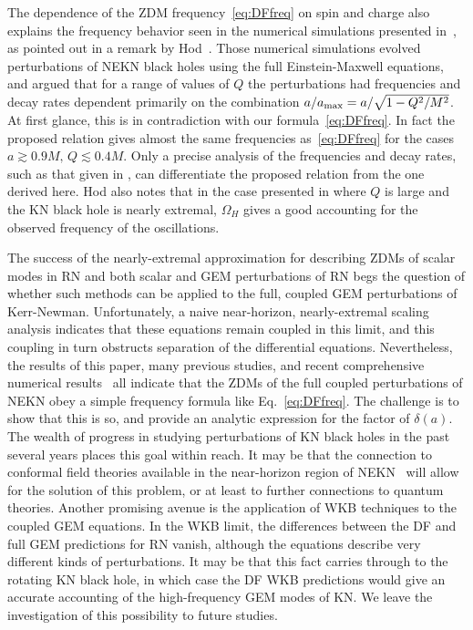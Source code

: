 \begin{refsection}
The dependence of the ZDM frequency~\eqref{eq:DFfreq} on spin and charge also explains the frequency behavior seen in the numerical simulations presented in~\cite{Zilhao:2014wqa}, as pointed out in a remark by Hod~\cite{Hod:2014uqa}. 
Those numerical simulations evolved perturbations of NEKN black holes using the full Einstein-Maxwell equations, and argued that for a range of values of $Q$ the perturbations had frequencies and decay rates dependent primarily on the combination $a/a_{\rm max} = a/ \sqrt{1 - Q^2/M^2}$. 
At first glance, this is in contradiction with our formula~\eqref{eq:DFfreq}. 
In fact the proposed relation gives almost the same frequencies as~\eqref{eq:DFfreq} for the cases $a\gtrsim0.9M, \, Q \lesssim 0.4 M$.
Only a precise analysis of the frequencies and decay rates, such as that given in \cite{Dias:2015wqa}, can differentiate the proposed relation from the one derived here.
Hod also notes that in the case presented in \cite{Zilhao:2014wqa} where $Q$ is large and the KN black hole is nearly extremal, $\Omega_H$ gives a good accounting for the observed frequency of the oscillations.

The success of the nearly-extremal approximation for describing ZDMs of scalar modes in RN and both scalar and GEM perturbations of RN begs the question of whether such methods can be applied to the full, coupled GEM perturbations of Kerr-Newman.
Unfortunately, a naive near-horizon, nearly-extremal scaling analysis indicates that these equations remain coupled in this limit, and this coupling in turn obstructs separation of the differential equations.
Nevertheless, the results of this paper, many previous studies, and recent comprehensive numerical results~\cite{Zilhao:2014wqa,Dias:2015wqa} all indicate that the ZDMs of the full coupled perturbations of NEKN obey a simple frequency formula like Eq.~\eqref{eq:DFfreq}. 
The challenge is to show that this is so, and provide an analytic expression for the factor of $\delta(a)$.
The wealth of progress in studying perturbations of KN black holes in the past several years places this goal within reach.
It may be that the connection to conformal field theories available in the near-horizon region of NEKN~\cite{Bardeen:1999px,Guica2009,Hartman:2008pb,Hartman:2009nz,Porfyriadis:2014fja} will allow for the solution of this problem, or at least to further connections to quantum theories.
Another promising avenue is the application of WKB techniques to the coupled GEM equations.
In the WKB limit, the differences between the DF and full GEM predictions for RN vanish, although the equations describe very different kinds of perturbations. 
It may be that this fact carries through to the rotating KN black hole, in which case the DF WKB predictions would give an accurate accounting of the high-frequency GEM modes of KN.
We leave the investigation of this possibility to future studies.


\end{refsection}
